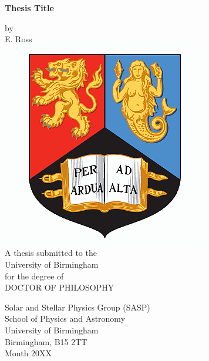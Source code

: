 \begin{titlepage}
\vspace{6cm}
\begin{center}
\begin{doublespace}
{\Huge \bf Thesis Title}
\end{doublespace}
\vspace{1cm}
by\\
\vspace{1cm}
{\Large E. Ross}\\
\vspace{2.5cm}
\includegraphics[scale=0.35]{onlyunilogo.png}\\
\vspace{2.5cm}
A thesis submitted to the \\
University of Birmingham \\
for the degree of \\
DOCTOR OF PHILOSOPHY\\
\end{center}
\vfill
\begin{flushright}     
Solar and Stellar Physics Group (SASP)\\
School of Physics and Astronomy \\
University of Birmingham \\
Birmingham, B15 2TT\\
Month 20XX\\
\vfill
\end{flushright}
\end{titlepage}
